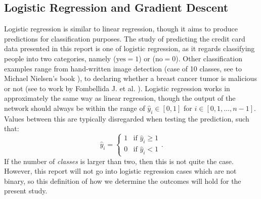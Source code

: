     \subsection{Logistic Regression and Gradient Descent}
        Logistic regression is similar to linear regression, though it aims to produce predictions for classification purposes. The study of predicting the credit card data presented in this report is one of logistic regression, as it regards classifying people into two categories, namely ($\text{yes}=1$) or ($\text{no}=0$). Other classification examples range from hand-written image detection (case of 10 classes, see to Michael Nielsen's book \cite{nielsenneural}), to declaring whether a breast cancer tumor is malicious or not (see to work by Fombellida J. et al. \cite{breastcancer}). Logistic regression works in approximately the same way as linear regression, though the output of the network should always be within the range of $\hat{y}_i\in [0,1]$ for $i \in [0,1,\hdots,n-1]$. Values between this are typically disregarded when testing the prediction, such that:
        \begin{equation}
            \hat{y}_i = \begin{cases} 1 & \text{if } \hat{y}_i\geq 1 \\ 0 & \text{if } \hat{y}_i < 1 \end{cases}.
        \end{equation}
        If the number of \textit{classes} is larger than two, then this is not quite the case. However, this report will not go into logistic regression cases which are not binary, so this definition of how we determine the outcomes will hold for the present study.
